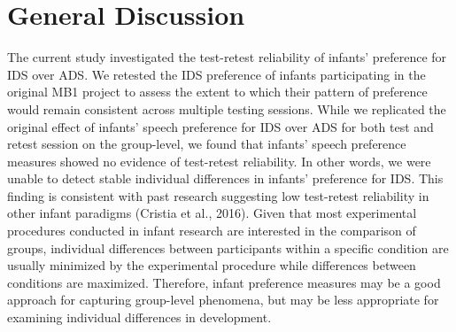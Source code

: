 \documentclass[
  man,floatsintext]{apa6}
\begin{document}
\hypertarget{general-discussion}{%
\section{General Discussion}\label{general-discussion}}

The current study investigated the test-retest reliability of infants' preference for IDS over ADS.
We retested the IDS preference of infants participating in the original MB1 project to assess the extent to which their pattern of preference would remain consistent across multiple testing sessions.
While we replicated the original effect of infants' speech preference for IDS over ADS for both test and retest session on the group-level, we found that infants' speech preference measures showed no evidence of test-retest reliability.
In other words, we were unable to detect stable individual differences in infants' preference for IDS.
This finding is consistent with past research suggesting low test-retest reliability in other infant paradigms (Cristia et al., 2016).
Given that most experimental procedures conducted in infant research are interested in the comparison of groups, individual differences between participants within a specific condition are usually minimized by the experimental procedure while differences between conditions are maximized.
Therefore, infant preference measures may be a good approach for capturing group-level phenomena, but may be less appropriate for examining individual differences in development.
\end{document}

